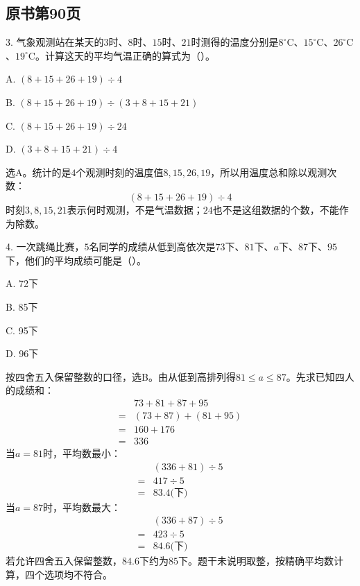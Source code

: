 

\subsection*{原书第90页}

3. 气象观测站在某天的\(3\)时、\(8\)时、\(15\)时、\(21\)时测得的温度分别是\(8^\circ\mathrm C\)、\(15^\circ\mathrm C\)、\(26^\circ\mathrm C\)、\(19^\circ\mathrm C\)。计算这天的平均气温正确的算式为（\hspace{1.8em}）。\par
\noindent A. \((8+15+26+19)\div4\)\par
\noindent B. \((8+15+26+19)\div(3+8+15+21)\)\par
\noindent C. \((8+15+26+19)\div24\)\par
\noindent D. \((3+8+15+21)\div4\)\par
\begin{BookAnswer}
选A。统计的是\(4\)个观测时刻的温度值\(8,15,26,19\)，所以用温度总和除以观测次数：\[(8+15+26+19)\div4\]时刻\(3,8,15,21\)表示何时观测，不是气温数据；\allowbreak{}\(24\)也不是这组数据的个数，不能作为除数。
\end{BookAnswer}

4. 一次跳绳比赛，\allowbreak{}\(5\)名同学的成绩从低到高依次是\(73\)下、\(81\)下、\(a\)下、\(87\)下、\(95\)下，他们的平均成绩可能是（\hspace{1.8em}）。\par
\noindent A. 72下\par
\noindent B. 85下\par
\noindent C. 95下\par
\noindent D. 96下\par
\begin{BookAnswer}
按四舍五入保留整数的口径，选B。由从低到高排列得\(81\leq a\leq87\)。先求已知四人的成绩和：
\[\begin{aligned}&73+81+87+95\\={}&(73+87)+(81+95)\\={}&160+176\\={}&336\end{aligned}\]
当\(a=81\)时，平均数最小：
\[\begin{aligned}&(336+81)\div5\\={}&417\div5\\={}&83.4\text{(下)}\end{aligned}\]
当\(a=87\)时，平均数最大：
\[\begin{aligned}&(336+87)\div5\\={}&423\div5\\={}&84.6\text{(下)}\end{aligned}\]
若允许四舍五入保留整数，\allowbreak{}\(84.6\)下约为\(85\)下。题干未说明取整，按精确平均数计算，四个选项均不符合。
\end{BookAnswer}

